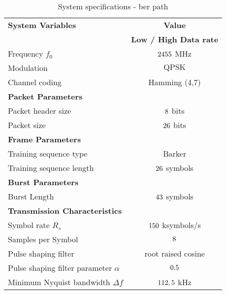 \begin{table}[htbp]
  \centering
  \caption{System specifications - ber path}
    \begin{tabular}{lc}
    \rowcolor[rgb]{ 0,  0,  0} \textcolor[rgb]{ 1,  1,  1}{\textbf{System Variables}}	& \textcolor[rgb]{ 1,  1,  1}{\textbf{Value}} 		\\
    \rowcolor[rgb]{ 0,  0,  0} \textcolor[rgb]{ 1,  1,  1}{} & \textcolor[rgb]{ 1,  1,  1}{\textbf{Low / High Data rate}} 				\\
    	Frequency $f_0$ 								& $2455$ MHz 							\\
    	Modulation 									& $\text{QPSK}$									\\
    	Channel coding 								& Hamming (4,7) 									\\

    \rowcolor[rgb]{ 0,  0,  0} \textcolor[rgb]{ 1,  1,  1}{\textbf{Packet Parameters}} & \textcolor[rgb]{ 1,  1,  1}{} 				\\
	Packet header size      							& $8 $  bits								\\
    	Packet size									& $26$  bits					 			\\
    
    \rowcolor[rgb]{ 0,  0,  0} \textcolor[rgb]{ 1,  1,  1}{\textbf{Frame Parameters}} & \textcolor[rgb]{ 1,  1,  1}{} 				\\
    	Training sequence type 							& Barker										 	\\
    	Training sequence length							& $26$ symbols 					 		\\
	
    \rowcolor[rgb]{ 0,  0,  0} \textcolor[rgb]{ 1,  1,  1}{\textbf{Burst Parameters}} & \textcolor[rgb]{ 1,  1,  1}{} 					\\
    	Burst Length									& $43 $ symbols							\\
	
    \rowcolor[rgb]{ 0,  0,  0} \textcolor[rgb]{ 1,  1,  1}{\textbf{Transmission Characteristics}} & \textcolor[rgb]{ 1,  1,  1}{} 		\\
    	Symbol rate $R_s$ 								& $150$ ksymbols/s 						\\
    	Samples per Symbol 					& $8$													\\

    	Pulse shaping filter 								& root raised cosine 									\\
    	Pulse shaping filter parameter $\alpha$ 				& $0.5$											\\
    	Minimum Nyquist bandwidth $\Delta f$ 				& $112,5$ kHz 					\\
    \end{tabular}
  \label{tab:specs_ber}
\end{table}


